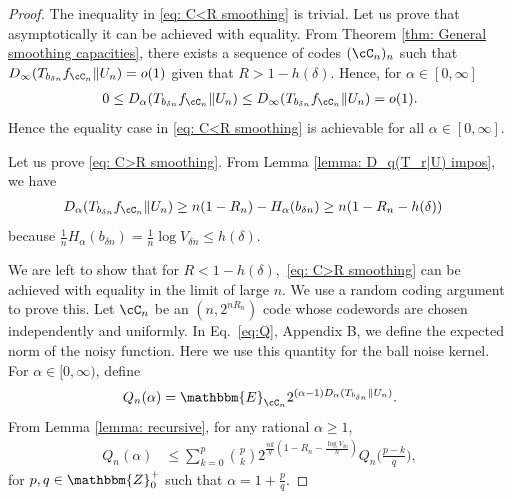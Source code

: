 \documentclass{amsart}
\theoremstyle{remark}
\newcommand{\ab}[1]{{\footnotesize\color{red}{[AB: #1]}}}
\begin{document}
\begin{proof}
The inequality in \eqref{eq: C<R smoothing} is trivial. Let us prove that asymptotically it can be achieved with equality.
From Theorem \ref{thm: General smoothing capacities}, there exists a sequence of codes  $(\cC_n)_n$ such that $D_{\infty}(T_{b_{\delta n}}f_{\cC_n}\|U_n) = o(1)$ given that $R>1-h(\delta)$. Hence, for $\alpha \in [0,\infty]$
\begin{align*}
    0 \leq D_{\alpha}(T_{b_{\delta n}}f_{\cC_n}\|U_n) \leq D_{\infty}(T_{b_{\delta n}}f_{\cC_n}\|U_n) = o(1).
\end{align*}
Hence the equality case in \eqref{eq: C<R smoothing} is achievable for all $\alpha \in [0,\infty]$. 

Let us prove \eqref{eq: C>R smoothing}. From Lemma \ref{lemma: D_q(T_r|U) impos}, we have 
\begin{align*}
    D_{\alpha}(T_{b_{\delta n}}f_{\cC_n}\|U_n) &\geq n(1-R_n)-H_{\alpha}(b_{\delta n}) \geq n(1-R_n-h(\delta))
\end{align*}
because $\frac{1}{n}H_{\alpha}(b_{\delta n}) = \frac{1}{n}\log V_{\delta n} \leq  h(\delta)$. 
  
We are left to show that for $R<1-h(\delta),$ \eqref{eq: C>R smoothing} can be achieved with equality in the limit of large $n$. We use a random coding argument to prove this. Let $\cC_n$ be an $(n,2^{nR_n})$ code whose codewords are chosen independently and uniformly. In Eq.~\eqref{eq:Q}, Appendix B, we define the expected norm of the noisy function. Here we use this quantity for the ball noise kernel. For $\alpha \in [0,\infty)$, define
$$
Q_n(\alpha) = \mathbbm{E}_{\cC_n}2^{(\alpha-1)D_{\alpha}(T_{b_{\delta n}}\|U_n)}.
$$ 
From Lemma \ref{lemma: recursive}, for any rational $\alpha \geq 1$, 
\begin{align}\label{eq: rec_ball}
    Q_n(\alpha) & \leq \sum_{k=0}^p \binom{p}{k} 2^{\frac{nk}{q}(1-R_n-\frac{\log V_{\delta n}}{n})}Q_n\Big(\frac{p-k}{q}\Big),
\end{align}
for $p,q \in \mathbbm{Z}_{0}^{+}$ such that $\alpha = 1+\frac pq$.


\end{proof}
\end{document}
